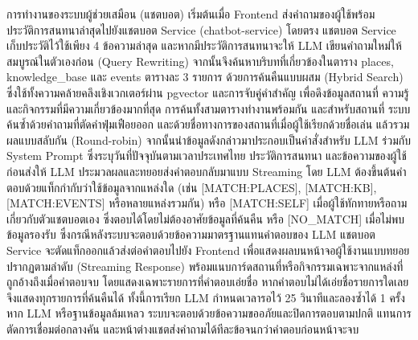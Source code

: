 การทำงานของระบบผู้ช่วยเสมือน (แชตบอต) เริ่มต้นเมื่อ Frontend ส่งคำถามของผู้ใช้พร้อมประวัติการสนทนาล่าสุดไปยังแชตบอต Service (chatbot-service) โดยตรง แชตบอต Service เก็บประวัติไว้ใช้เพียง 4 ข้อความล่าสุด และหากมีประวัติการสนทนาจะให้ LLM เขียนคำถามใหม่ให้สมบูรณ์ในตัวเองก่อน (Query Rewriting) จากนั้นจึงค้นหาบริบทที่เกี่ยวข้องในตาราง places, knowledge\_base และ events ตารางละ 3 รายการ ด้วยการค้นคืนแบบผสม (Hybrid Search) ซึ่งใช้ทั้งความคล้ายคลึงเชิงเวกเตอร์ผ่าน pgvector และการจับคู่คำสำคัญ เพื่อดึงข้อมูลสถานที่ ความรู้ และกิจกรรมที่มีความเกี่ยวข้องมากที่สุด การค้นทั้งสามตารางทำงานพร้อมกัน และสำหรับสถานที่ ระบบค้นซ้ำด้วยคำถามที่ตัดคำฟุ่มเฟือยออก และด้วยชื่อทางการของสถานที่เมื่อผู้ใช้เรียกด้วยชื่อเล่น แล้วรวมผลแบบสลับกัน (Round-robin) จากนั้นนำข้อมูลดังกล่าวมาประกอบเป็นคำสั่งสำหรับ LLM ร่วมกับ System Prompt ซึ่งระบุวันที่ปัจจุบันตามเวลาประเทศไทย ประวัติการสนทนา และข้อความของผู้ใช้ ก่อนส่งให้ LLM ประมวลผลและทยอยส่งคำตอบกลับมาแบบ Streaming โดย LLM ต้องขึ้นต้นคำตอบด้วยแท็กกำกับว่าใช้ข้อมูลจากแหล่งใด (เช่น [MATCH:PLACES], [MATCH:KB], [MATCH:EVENTS] หรือหลายแหล่งรวมกัน) หรือ [MATCH:SELF] เมื่อผู้ใช้ทักทายหรือถามเกี่ยวกับตัวแชตบอตเอง ซึ่งตอบได้โดยไม่ต้องอาศัยข้อมูลที่ค้นคืน หรือ [NO\_MATCH] เมื่อไม่พบข้อมูลรองรับ ซึ่งกรณีหลังระบบจะตอบด้วยข้อความมาตรฐานแทนคำตอบของ LLM แชตบอต Service จะตัดแท็กออกแล้วส่งต่อคำตอบไปยัง Frontend เพื่อแสดงผลบนหน้าจอผู้ใช้งานแบบทยอยปรากฏตามลำดับ (Streaming Response) พร้อมแนบการ์ดสถานที่หรือกิจกรรมเฉพาะจากแหล่งที่ถูกอ้างถึงเมื่อคำตอบจบ โดยแสดงเฉพาะรายการที่คำตอบเอ่ยชื่อ หากคำตอบไม่ได้เอ่ยชื่อรายการใดเลยจึงแสดงทุกรายการที่ค้นคืนได้ ทั้งนี้การเรียก LLM กำหนดเวลารอไว้ 25 วินาทีและลองซ้ำได้ 1 ครั้ง หาก LLM หรือฐานข้อมูลล้มเหลว ระบบจะตอบด้วยข้อความขออภัยและปิดการตอบตามปกติ แทนการตัดการเชื่อมต่อกลางคัน และหน้าต่างแชตส่งคำถามได้ทีละข้อจนกว่าคำตอบก่อนหน้าจะจบ

